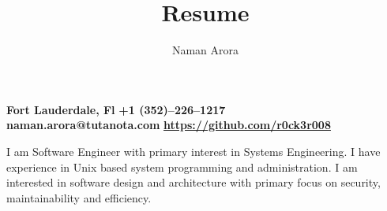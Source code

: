 \documentclass[12]{Resume}
\begin{document}
\renewcommand{\maketitle} {
    \begin{flushleft}
        \textbf{\Huge\theauthor}
    \end{flushleft}
    \begin{flushleft}
        \small{\textbf{{\faMapMarker} \hspace{0.2cm} Fort Lauderdale, Fl} \hspace{1.75cm} \textbf{{\faMobile} \hspace{0.2cm} +1 (352)--226--1217} \\
        \textbf{{\faEnvelope} \hspace{0.1cm} naman.arora@tutanota.com} \hspace{0.5cm}
        \textbf{{\faGithub} \hspace{0.1cm} \href{https://github.com/r0ck3r008}{https://github.com/r0ck3r008}}}
    \end{flushleft}
}

\title{Resume}
\author{Naman Arora}
\maketitle


I am Software Engineer with primary interest in Systems Engineering. I have experience in Unix based system programming and administration. I am interested in software design and architecture with primary focus on security, maintainability and efficiency.
    
\end{document}
